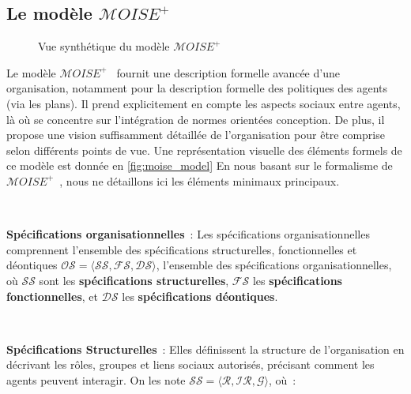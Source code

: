 \subsection{Le modèle $\mathcal{M}OISE^+$}

\begin{figure}[h!]
  \centering
  
  \caption{Vue synthétique du modèle $\mathcal{M}OISE^+$}
  \label{fig:moise_model}
\end{figure}

Le modèle $\mathcal{M}OISE^+$~\citep{Hubner2002} fournit une description formelle avancée d'une organisation, notamment pour la description formelle des politiques des agents (via les plans). Il prend explicitement en compte les aspects sociaux entre agents, là où  se concentre sur l'intégration de normes orientées conception. De plus, il propose une vision suffisamment détaillée de l'organisation pour être comprise selon différents points de vue. Une représentation visuelle des éléments formels de ce modèle est donnée en \autoref{fig:moise_model}
En nous basant sur le formalisme de $\mathcal{M}OISE^+$~\citep{hubner2007moise}, nous ne détaillons ici les éléments minimaux principaux.

\

\noindent \textbf{Spécifications organisationnelles}~: Les spécifications organisationnelles comprennent l'ensemble des spécifications structurelles, fonctionnelles et déontiques \quad $\mathcal{OS} = \langle \mathcal{SS}, \mathcal{FS}, \mathcal{DS} \rangle$, l'ensemble des spécifications organisationnelles, où $\mathcal{SS}$ sont les \textbf{spécifications structurelles}, $\mathcal{FS}$ les \textbf{spécifications fonctionnelles}, et $\mathcal{DS}$ les \textbf{spécifications déontiques}.

\

\noindent \textbf{Spécifications Structurelles}~: Elles définissent la structure de l'organisation en décrivant les rôles, groupes et liens sociaux autorisés, précisant comment les agents peuvent interagir. On les note \quad $\mathcal{SS} = \langle \mathcal{R}, \mathcal{IR}, \mathcal{G} \rangle$, où~:

